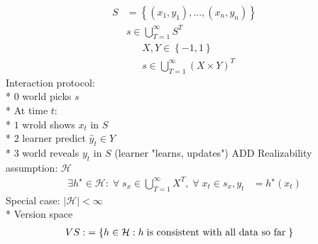 \documentclass{article}
\begin{document}
\begin{align*}
S  &= \left\{\left(x_{1}, y_{1}\right), ..., \left(x_{n}, y_{n}\right)\right\}
\\ &s  \in \displaystyle\bigcup _{T=1}^{\infty} S^{T}
\end{align*}
\begin{align*}
&X , Y  \in \left\{-1, 1\right\}
\\ &s  \in \displaystyle\bigcup _{T=1}^{\infty} \left(X \times Y\right)^{T}
\end{align*}
Interaction protocol:
\\* $\boxed{0}$ world picks $s $
\\* At time $t: $
\\* $\boxed{1}$ wrold shows $x_{t}$ in $S $
\\* $\boxed{2}$ learner predict $\hat{y}_{t} \in Y $
\\* $\boxed{3}$ world reveals $y_{t}$ in $S $ (learner "learns, updates")
\newline \newline
ADD Realizability assumption: $\mathcal{H}$
\begin{align*}
\exists h^\star  \in \mathcal{H} : \;\forall\; s_{x} \in \displaystyle\bigcup _{T=1}^{\infty} X^{T} , \;\forall\; x_{t} \in s_{x} , y_{t} &= h^\star \left(x_{t}\right)
\end{align*}
Special case: $\left|  \mathcal{H}  \right| < \infty$
\\* Version space
\begin{align*}
VS  :&= \left\{h \in \mathcal{H} : h  \text{\;is consistent with all data so far\;}\right\}
\end{align*}
\end{document}
